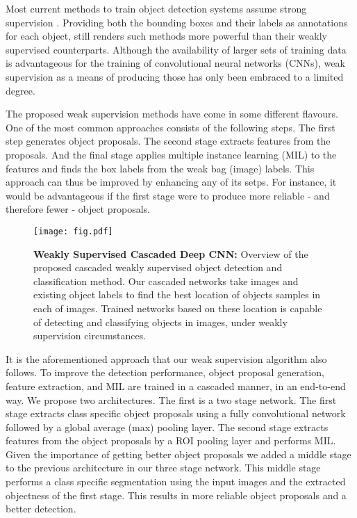 \documentclass[10pt,twocolumn,letterpaper]{article}
\begin{document}
Most current methods to train object detection systems assume strong supervision \cite{fastRCNN, fasterRCNN, SSD}. Providing both the bounding boxes and their labels as annotations for each object, still renders such methods more powerful than their weakly supervised counterparts. Although the availability of larger sets of training data is advantageous for the training of convolutional neural networks (CNNs), weak supervision as a means of producing those has only been embraced to a limited degree. 

The proposed weak supervision methods have come in some different flavours. One of the most common approaches \cite{cinbis} consists of the following steps. The first step
generates object proposals. The second stage extracts features from the proposals. And the final stage applies multiple instance learning (MIL) to the features and finds the box labels from the weak bag (image) labels. This approach can thus be improved by enhancing any of its setps. For instance, it would be advantageous if the first stage were to produce more reliable - and therefore fewer - object proposals.   

\begin{figure}[t]
\centering
{\texttt{[image: fig.pdf]} 
} \caption{\textbf{Weakly Supervised Cascaded Deep CNN:} Overview of the proposed cascaded weakly supervised object detection and classification method. Our cascaded networks take images and existing object labels to find the best location of objects samples in each of images. Trained networks based on these location is capable of detecting and classifying objects in images, under weakly supervision circumstances. } 
\label{fig:gradient}
\end{figure}

It is the aforementioned approach that our weak supervision algorithm also follows. To improve the detection performance, object proposal generation, feature extraction, and MIL are trained in a cascaded manner, in an end-to-end way.  
We propose two architectures. The first is a two stage network. The first stage extracts class specific object proposals using a fully convolutional network followed by a global average (max) pooling layer. The second stage extracts features from the object proposals by a ROI pooling layer and performs MIL. Given the importance of getting better object proposals we added a middle stage to the previous architecture in our three stage network. This middle stage performs a class specific segmentation using the input images and the extracted objectness of the first stage. This results in more reliable object proposals and a better detection.
\end{document}
